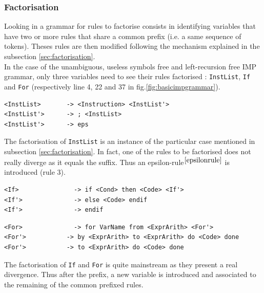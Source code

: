 \documentclass[a4paper,11pt]{article}
\begin{document}
    \subsubsection{Factorisation}
      Looking in a grammar for rules to factorise consists in identifying variables that have two or more rules that share a common prefix (i.e. a same sequence of tokens). Theses rules are then modified following the mechanism explained in the subsection \ref{sec:factorisation}.\\
      In the case of the unambiguous, useless symbols free and left-recursion free IMP grammar, only three variables need to see their rules factorised : \verb|InstList|, \verb|If| and \verb|For| (respectively line 4, 22 and 37 in fig.\ref{fig:basicimpgrammar}).
      \begin{lstlisting}
<InstList>	     -> <Instruction> <InstList'> 
<InstList'>	     -> ; <InstList> 
<InstList'>	     -> eps\end{lstlisting}
      The factorisation of \verb|InstList| is an instance of the particular case mentioned in subsection \ref{sec:factorisation}. In fact, one of the rules to be factorised does not really diverge as it equals the suffix. Thus an epsilon-rule$^{\ref{epsilonrule}}$ is introduced (rule 3).
      \begin{lstlisting}
<If>	           -> if <Cond> then <Code> <If'> 
<If'>	           -> else <Code> endif 
<If'>	           -> endif\end{lstlisting}
      \begin{lstlisting}
<For>	           -> for VarName from <ExprArith> <For'> 
<For'>	         -> by <ExprArith> to <ExprArith> do <Code> done 
<For'>	         -> to <ExprArith> do <Code> done\end{lstlisting}
      The factorisation of \verb|If| and \verb|For| is quite mainstream as they present a real divergence. Thus after the prefix,  a new variable is introduced and associated to the remaining of the common prefixed rules.
      
\end{document}
